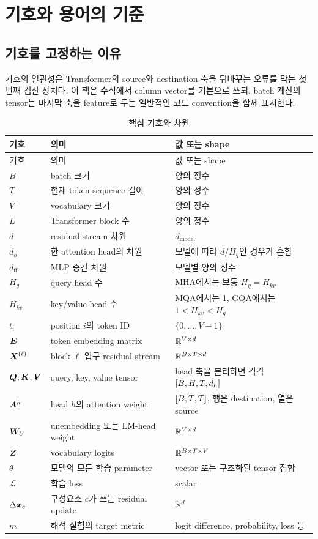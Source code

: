 \chapter{기호와 용어의 기준}
\label{app:notation}

\section{기호를 고정하는 이유}

기호의 일관성은 Transformer의 source와 destination 축을 뒤바꾸는 오류를 막는 첫 번째 검산 장치다.
이 책은 수식에서 column vector를 기본으로 쓰되, batch 계산의 tensor는 마지막 축을 feature로 두는 일반적인 코드 convention을 함께 표시한다.

\begin{longtable}{@{}p{}p{}p{}@{}}
\caption{핵심 기호와 차원}\label{tab:notation}\\
\toprule
기호 & 의미 & 값 또는 shape \\
\midrule
\endfirsthead
\toprule
기호 & 의미 & 값 또는 shape \\
\midrule
\endhead
$B$ & batch 크기 & 양의 정수 \\
$T$ & 현재 token sequence 길이 & 양의 정수 \\
$V$ & vocabulary 크기 & 양의 정수 \\
$L$ & Transformer block 수 & 양의 정수 \\
$d$ & residual stream 차원 & $d_{\mathrm{model}}$ \\
$d_h$ & 한 attention head의 차원 & 모델에 따라 $d/H_q$인 경우가 흔함 \\
$d_{\mathrm{ff}}$ & MLP 중간 차원 & 모델별 양의 정수 \\
$H_q$ & query head 수 & MHA에서는 보통 $H_q=H_{kv}$ \\
$H_{kv}$ & key/value head 수 & MQA에서는 1, GQA에서는 $1<H_{kv}<H_q$ \\
$t_i$ & position $i$의 token ID & $\{0,\ldots,V-1\}$ \\
$\bm{E}$ & token embedding matrix & $\mathbb{R}^{V\times d}$ \\
$\bm{X}^{(\ell)}$ & block $\ell$ 입구 residual stream & $\mathbb{R}^{B\times T\times d}$ \\
$\bm{Q},\bm{K},\bm{V}$ & query, key, value tensor & head 축을 분리하면 각각 $\left[B,H,T,d_h\right]$ \\
$\bm{A}^{h}$ & head $h$의 attention weight & $\left[B,T,T\right]$, 행은 destination, 열은 source \\
$\bm{W}_U$ & unembedding 또는 LM-head weight & $\mathbb{R}^{V\times d}$ \\
$\bm{Z}$ & vocabulary logits & $\mathbb{R}^{B\times T\times V}$ \\
$\theta$ & 모델의 모든 학습 parameter & vector 또는 구조화된 tensor 집합 \\
$\mathcal{L}$ & 학습 loss & scalar \\
$\Delta\bm{x}_c$ & 구성요소 $c$가 쓰는 residual update & $\mathbb{R}^d$ \\
$m$ & 해석 실험의 target metric & logit difference, probability, loss 등 \\
\bottomrule
\end{longtable}


